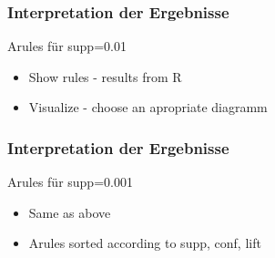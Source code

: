 \documentclass[12pt, xcolor=table]{beamer}
\begin{document}
\begin{frame}
    \frametitle{Interpretation der Ergebnisse}
    \begin{block}{Arules für supp=0.01}
        \begin{itemize}
            \item Show rules - results from R
            \item Visualize - choose an apropriate diagramm
        \end{itemize}
    \end{block}
\end{frame}
\begin{frame}
    \frametitle{Interpretation der Ergebnisse}
    \begin{block}{Arules für supp=0.001}
        \begin{itemize}
           \item Same as above
           \item Arules sorted according to supp, conf, lift
        \end{itemize}
    \end{block}
\end{frame}
\end{document}
